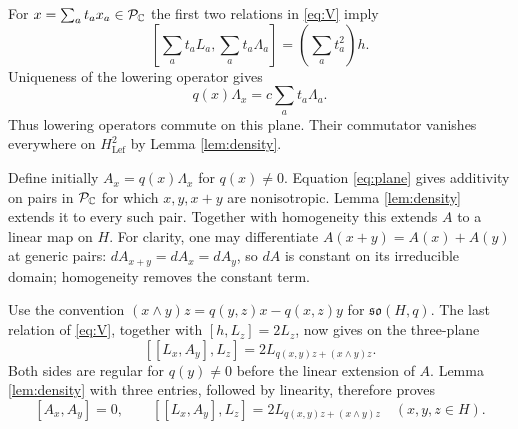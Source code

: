 For $x=\sum_at_ax_a\in\mathcal P_{\mathbb C}$ the first two relations in
\eqref{eq:V} imply
\[
 [\sum_at_aL_a,\sum_at_a\Lambda_a]=(\sum_at_a^2)h.
\]
Uniqueness of the lowering operator gives
\begin{equation}\label{eq:plane}
 q(x)\Lambda_x=c\sum_at_a\Lambda_a.
\end{equation}
Thus lowering operators commute on this plane. Their commutator
vanishes everywhere on $H_{\mathrm{Lef}}^2$ by Lemma
\ref{lem:density}.

Define initially $A_x=q(x)\Lambda_x$ for $q(x)\ne0$. Equation
\eqref{eq:plane} gives additivity on pairs in $\mathcal P_{\mathbb C}$
for which $x,y,x+y$ are nonisotropic. Lemma \ref{lem:density}
extends it to every such pair. Together with homogeneity this
extends $A$ to a linear map on $H$. For clarity, one may differentiate
$A(x+y)=A(x)+A(y)$ at generic pairs: $dA_{x+y}=dA_x=dA_y$,
so $dA$ is constant on its irreducible domain; homogeneity removes
the constant term.

Use the convention
$(x\wedge y)z=q(y,z)x-q(x,z)y$ for $\mathfrak{so}(H,q)$.
The last relation of \eqref{eq:V}, together with
$[h,L_z]=2L_z$, now gives on the three-plane
\[
 [[L_x,A_y],L_z]=2L_{q(x,y)z+(x\wedge y)z}.
\]
Both sides are regular for $q(y)\ne0$ before the linear extension
of $A$. Lemma \ref{lem:density} with three entries, followed by
linearity, therefore proves
\begin{equation}\label{eq:structure}
 [A_x,A_y]=0,\qquad
 [[L_x,A_y],L_z]=2L_{q(x,y)z+(x\wedge y)z}
 \quad(x,y,z\in H).
\end{equation}

